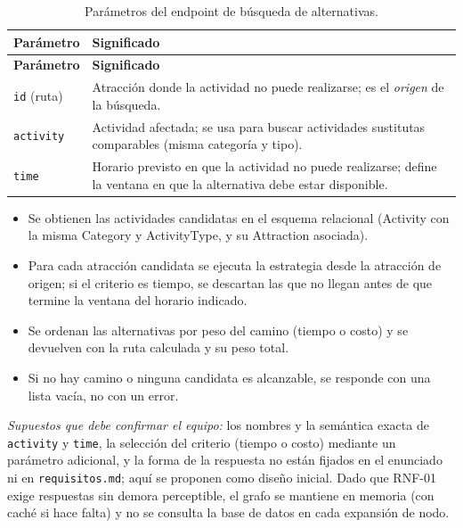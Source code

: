 \documentclass[11pt,a4paper]{article}
\begin{document}
{\footnotesize\setlength{\tabcolsep}{3pt}\renewcommand{\arraystretch}{1.15}
\begin{longtable}{|>{\raggedright\arraybackslash}p{3.08cm}|>{\raggedright\arraybackslash}p{12.68cm}|}
\caption{Parámetros del endpoint de búsqueda de alternativas.}\label{tab:endpoint}\\ \hline
\rowcolor{gray!20} \textbf{Parámetro} & \textbf{Significado} \\ \hline
\endfirsthead
\hline \rowcolor{gray!20} \textbf{Parámetro} & \textbf{Significado} \\ \hline
\endhead
\texttt{id} (ruta) & Atracción donde la actividad no puede realizarse; es el \textit{origen} de la búsqueda. \\ \hline
\texttt{activity} & Actividad afectada; se usa para buscar actividades sustitutas comparables (misma categoría y tipo). \\ \hline
\texttt{time} & Horario previsto en que la actividad no puede realizarse; define la ventana en que la alternativa debe estar disponible. \\ \hline
\end{longtable}}
\vspace{2pt}
\begin{itemize}[leftmargin=1.2em,itemsep=2pt,topsep=3pt]
\item Se obtienen las actividades candidatas en el esquema relacional (Activity con la misma Category y ActivityType, y su Attraction asociada).
\item Para cada atracción candidata se ejecuta la estrategia desde la atracción de origen; si el criterio es tiempo, se descartan las que no llegan antes de que termine la ventana del horario indicado.
\item Se ordenan las alternativas por peso del camino (tiempo o costo) y se devuelven con la ruta calculada y su peso total.
\item Si no hay camino o ninguna candidata es alcanzable, se responde con una lista vacía, no con un error.
\end{itemize}
\textit{Supuestos que debe confirmar el equipo:} los nombres y la semántica exacta de \texttt{activity} y \texttt{time}, la selección del criterio (tiempo o costo) mediante un parámetro adicional, y la forma de la respuesta no están fijados en el enunciado ni en \texttt{requisitos.md}; aquí se proponen como diseño inicial. Dado que RNF-01 exige respuestas sin demora perceptible, el grafo se mantiene en memoria (con caché si hace falta) y no se consulta la base de datos en cada expansión de nodo.
\end{document}
